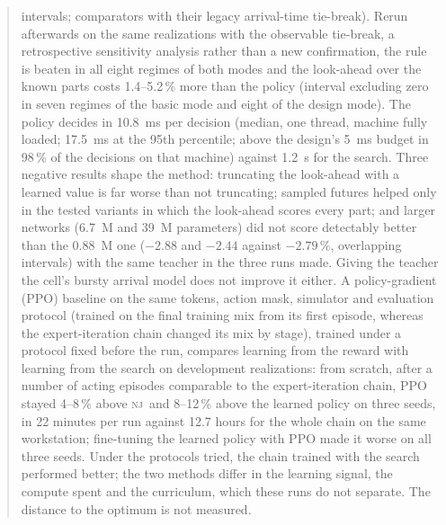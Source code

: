 \documentclass[11pt,a4paper]{article}
\theoremstyle{plain}
\theoremstyle{definition}
\theoremstyle{remark}
\newcommand{\nj}{\textsc{nj}}
\begin{document}
\begin{abstract}
intervals; comparators with their legacy arrival-time tie-break). Rerun afterwards on the
same realizations with the observable tie-break, a retrospective sensitivity analysis
rather than a new confirmation, the rule is beaten in all eight regimes of both modes and
the look-ahead over the known parts costs 1.4--5.2\,\% more than the policy (interval
excluding zero in seven regimes of the basic mode and eight of the design mode). The policy
decides in 10.8~ms per
decision (median, one thread, machine fully loaded; 17.5~ms at the 95th percentile;
above the design's 5~ms budget in 98\,\% of the decisions on that machine)
against 1.2~s for the search. Three negative results shape the method:
truncating the look-ahead with a learned value is far worse than not truncating; sampled
futures helped only in the tested variants in which the look-ahead scores every part; and larger networks (6.7~M and
39~M parameters) did not score detectably better than the 0.88~M one ($-2.88$ and $-2.44$ against $-2.79$\,\%, overlapping intervals) with the same teacher in the three runs made. Giving the teacher the cell's
bursty arrival model does not improve it either. A policy-gradient (PPO) baseline on the
same tokens, action mask, simulator and evaluation protocol (trained on the final
training mix from its first episode, whereas the expert-iteration chain changed its mix
by stage), trained under a protocol fixed before the run, compares learning from the reward with learning from the search on
development realizations: from scratch, after a number of acting episodes comparable to
the expert-iteration chain, PPO stayed 4--8\,\% above \nj\ and 8--12\,\% above the
learned policy on three seeds, in 22 minutes per run against 12.7 hours for the whole
chain on the same workstation; fine-tuning the learned policy with PPO made it worse on
all three seeds. Under the protocols tried, the chain trained with the search performed
better; the two methods differ in the learning signal, the compute spent and the
curriculum, which these runs do not separate. The
distance to the optimum is not measured.
\end{abstract}

\end{document}
